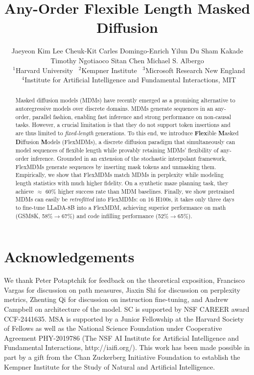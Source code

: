 \documentclass{article}
\title{Any-Order Flexible Length Masked Diffusion}
\author{Jaeyeon Kim\xthanks{$^\star$equal contribution, randomized ordering; Lee Cheuk-Kit led the theoretical development of the method and engineering effort; Jaeyeon Kim led experiment development and paper presentation. $^\dagger$ lead senior authors.}\xsup{$1$,$\star$} 
\hspace{2.1em}
Lee Cheuk-Kit\xsup{$1,2$,$\star$}
\hspace{2.1em}
Carles Domingo-Enrich\xsup{$3$}
\hspace{2.1em}
Yilun Du\xsup{$1$,$2$}
\AND
Sham Kakade\xsup{$1$,$2$}
\hspace{2.1em}
Timothy Ngotiaoco\xsup{$1$,$2$}
\hspace{2.1em}
Sitan Chen\xsup{$1$,$\dagger$}
\hspace{2.1em}
Michael S. Albergo\xsup{$1,2,4$,$\dagger$}
\\[1.0ex]
~$^1$Harvard University ~$^2$Kempner Institute ~$^3$Microsoft Research New England \\~$^4$Institute for Artificial Intelligence and Fundamental Interactions, MIT
}
\begin{document}
\maketitle
\begin{abstract}
Masked diffusion models (MDMs) have recently emerged as a promising alternative to autoregressive models over discrete domains. MDMs generate sequences in an any-order, parallel fashion, enabling fast inference and strong performance on non-causal tasks. However, a crucial limitation is that they do not support token insertions and are thus limited to \emph{fixed-length} generations. To this end, we introduce \textbf{Flex}ible \textbf{M}asked \textbf{D}iffusion \textbf{M}odels (FlexMDMs), a discrete diffusion paradigm that simultaneously can model sequences of flexible length while provably retaining MDMs' flexibility of any-order inference. Grounded in an extension of the stochastic interpolant framework, FlexMDMs generate sequences by inserting mask tokens and unmasking them. Empirically, we show that FlexMDMs match MDMs in perplexity while modeling length statistics with much higher fidelity. On a synthetic maze planning task, they achieve $\approx$ 60\% higher success rate than MDM baselines. Finally, we show pretrained MDMs can easily be \emph{retrofitted} into FlexMDMs: on 16 H100s, it takes only three days to fine-tune LLaDA-8B into a FlexMDM, achieving superior performance on math (GSM8K, 58\%$\to$67\%) and code infilling performance (52\%$\to$65\%).
\end{abstract}






\section*{Acknowledgements}
We thank Peter Potaptchik for feedback on the theoretical exposition, Francisco Vargas for discussion on path measures, Jiaxin Shi for discussion on perplexity metrics, Zhenting Qi
for discussion on instruction fine-tuning, and Andrew Campbell on architecture of the model. SC is supported by NSF CAREER award CCF-2441635. MSA is supported by a Junior Fellowship at the Harvard Society of Fellows as well as the National Science Foundation under Cooperative Agreement PHY-2019786 (The NSF AI Institute for Artificial Intelligence and Fundamental Interactions, http://iaifi.org/). This work has been made possible in part by a gift from the Chan Zuckerberg Initiative Foundation to establish the Kempner Institute for the Study of Natural and Artificial Intelligence.



\nocite{*}

\newpage
\tableofcontents
\appendix
\newpage




\end{document}
